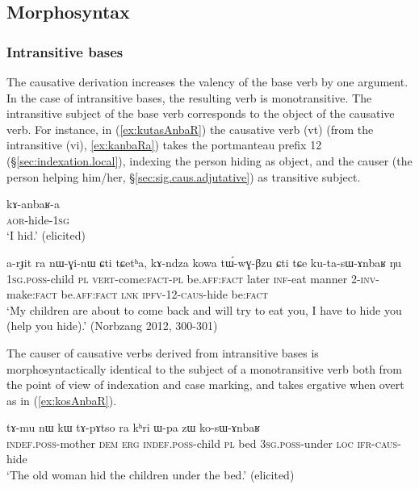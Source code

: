  

\subsection{Morphosyntax} \label{sec:sig.caus.morphosyntax}

\subsubsection{Intransitive bases} \label{sec:sig.caus.intr}
The causative derivation increases the valency of the base verb by one argument. In the case of intransitive bases, the resulting verb is monotransitive. The intransitive subject of the base verb  corresponds to the object of the causative verb. For instance, in (\ref{ex:kutasAnbaR}) the causative verb  (vt) (from the intransitive  (vi), \ref{ex:kanbaRa})  takes the portmanteau prefix 1\fl{}2  (§\ref{sec:indexation.local}), indexing the person hiding as object, and the causer (the person helping him/her, §\ref{sec:sig.caus.adjutative}) as transitive subject.


\begin{exe}
\ex \label{ex:kanbaRa}
\gll kɤ-anbaʁ-a \\
\textsc{aor}-hide-\textsc{1sg} \\
\glt `I hid.' (elicited)
\end{exe}

\begin{exe}
\ex \label{ex:kutasAnbaR}
\gll a-rɟit ra nɯ-ɣi-nɯ ɕti tɕetʰa, kɤ-ndza kowa tɯ́-wɣ-βzu ɕti tɕe ku-ta-sɯ-ɤnbaʁ ŋu \\
\textsc{1sg}.\textsc{poss}-child \textsc{pl} \textsc{vert}-come:\textsc{fact}-\textsc{pl} be.\textsc{aff}:\textsc{fact} later \textsc{inf}-eat manner 2-\textsc{inv}-make:\textsc{fact} be.\textsc{aff}:\textsc{fact} \textsc{lnk} \textsc{ipfv}-1\fl{}2-\textsc{caus}-hide be:\textsc{fact} \\
\glt `My children are about to come back and will try to eat you, I have to hide you (help you hide).' (Norbzang 2012, 300-301)
\end{exe}
 
The causer of causative verbs derived from intransitive bases is morphosyntactically identical to the subject of a monotransitive verb both from the point of view of indexation and case marking, and takes ergative when overt as in (\ref{ex:kosAnbaR}).

\begin{exe}
\ex \label{ex:kosAnbaR}
\gll tɤ-mu nɯ kɯ  tɤ-pɤtso ra kʰri ɯ-pa zɯ ko-sɯ-ɤnbaʁ  \\
\textsc{indef}.\textsc{poss}-mother \textsc{dem} \textsc{erg} \textsc{indef}.\textsc{poss}-child \textsc{pl} bed \textsc{3sg}.\textsc{poss}-under \textsc{loc} \textsc{ifr}-\textsc{caus}-hide \\
\glt `The old woman hid the children under the bed.' (elicited)
\end{exe}

